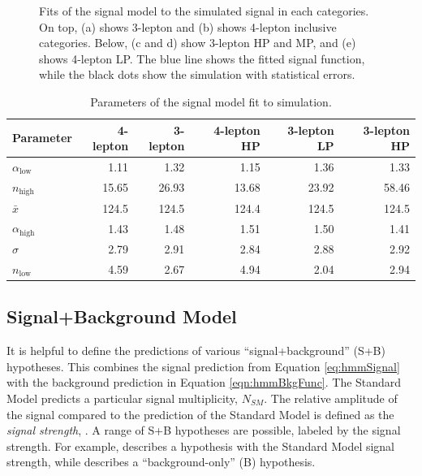 {\begin{minipage}{\textwidth}
\begin{figure}[H]
  \caption{Fits of the signal model to the simulated signal in each categories. 
On top, (a) shows 3-lepton and (b) shows 4-lepton inclusive categories.
Below, (c and d) show 3-lepton HP and MP, and (e) shows 4-lepton LP.
The blue line shows the fitted signal function, while the black dots show the simulation with statistical errors.
}
    \label{fig:hmmSignalFit}
\end{figure}
\begin{table}[H]
 \caption{Parameters of the signal model fit to simulation.}
 \begin{center}
\begin{tabular}{l r r r r r}\toprule
Parameter & 4-lepton & 3-lepton & 4-lepton HP & 3-lepton LP & 3-lepton HP \\
\midrule
$\alpha_\text{low}$ & 1.11 & 1.32 & 1.15 & 1.36 & 1.33 \\
$n_\text{high}$ & 15.65 & 26.93 & 13.68 & 23.92 & 58.46 \\
$\bar{x}$ & 124.5 & 124.5 & 124.4 & 124.5 & 124.5 \\
$\alpha_\text{high}$ & 1.43 & 1.48 & 1.51 & 1.50 & 1.41 \\
$\sigma$ & 2.79 & 2.91 & 2.84 & 2.88 & 2.92 \\
$n_\text{low}$ & 4.59 & 2.67 & 4.94 & 2.04 & 2.94 \\
\bottomrule\end{tabular}
 \end{center}
\label{tab:hmmSignalFit}
\end{table}
\end{minipage}
\clearpage
}


\subsection{Signal+Background Model}

It is helpful to define the predictions of various ``signal+background'' (S+B) hypotheses.
This combines the signal prediction from Equation \ref{eq:hmmSignal} with the background prediction in Equation \ref{eqn:hmmBkgFunc}.
The Standard Model predicts a particular signal multiplicity, $N_{SM}$.
The relative amplitude of the signal compared to the prediction of the Standard Model is defined as the \emph{signal strength}, \mus.
A range of S+B hypotheses are possible, labeled by the signal strength.
For example,  describes a hypothesis with the Standard Model signal strength, while  describes a ``background-only'' (B) hypothesis.

